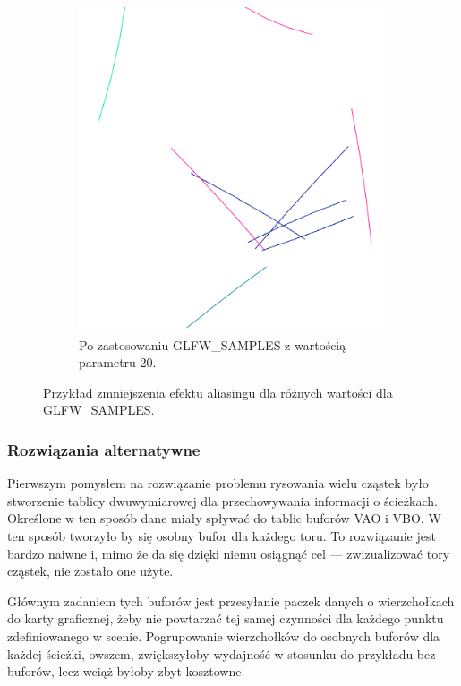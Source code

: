 \begin{figure}[H]
\begin{subfigure}{0.5\textwidth}
		\includegraphics[width=\textwidth]{Wart20.png}
    	\caption{Po zastosowaniu GLFW\_SAMPLES z wartością parametru 20.}
		\label{rys16}
	\end{subfigure}
    \caption{Przykład zmniejszenia efektu aliasingu dla różnych wartości dla GLFW\_SAMPLES.}
    \label{rys17}
\end{figure}

\subsubsection{Rozwiązania alternatywne}

Pierwszym pomysłem na rozwiązanie problemu rysowania wielu cząstek było stworzenie tablicy dwuwymiarowej dla przechowywania informacji o ścieżkach. Określone w ten sposób dane miały spływać do tablic buforów VAO i VBO. W ten sposób tworzyło by się osobny bufor dla każdego toru. To rozwiązanie jest bardzo naiwne i, mimo że da się dzięki niemu osiągnąć cel --- zwizualizować tory cząstek, nie zostało one użyte. 

Głównym zadaniem tych buforów jest przesyłanie paczek danych o wierzchołkach do karty graficznej, żeby nie powtarzać tej samej czynności dla każdego punktu zdefiniowanego w scenie. Pogrupowanie wierzchołków do osobnych buforów dla każdej ścieżki, owszem, zwiększyłoby wydajność w stosunku do przykładu bez buforów, lecz wciąż byłoby zbyt kosztowne.

